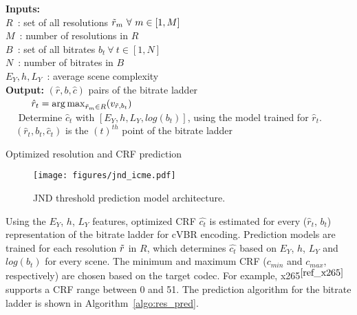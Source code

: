 \documentclass{article}
\DeclareMathOperator*{\argmax}{arg\,max}
\begin{document}
\begin{algorithm}[t]
\textbf{Inputs:}\\
\quad $R$~: set of all resolutions $\Tilde{r}_m~\forall~m \in [1, M]$ \\
\quad $M$~: number of resolutions in $R$\\
\quad $B$~: set of all bitrates $b_t~\forall~t \in [1, N]$ \\
\quad $N$~: number of bitrates in $B$\\
\quad $E_Y, h, L_Y$~: average scene complexity \\
\textbf{Output:} $(\hat{r},b,\hat{c})$ pairs of the bitrate ladder \\

{
$\quad$ 
$\quad$ $\hat{r}_{t} = \argmax_{\Tilde{r}_{m}\in R}(v_{\Tilde{r}, b_{t}})$\\
$\quad$ Determine $\hat{c}_{t}$ with $[E_Y, h, L_Y, log(b_t)]$, using the model trained for $\hat{r}_{t}$.\\
$\quad (\hat{r}_{t}, b_{t}, \hat{c}_{t})$ is the $(t)^{th}$ point of the bitrate ladder\\
}
\caption{Optimized resolution and CRF prediction}
\label{algo:res_pred}
\end{algorithm}
\setlength{\textfloatsep}{3pt}
\begin{figure*}[t]
\centering
\texttt{[image: figures/jnd\_icme.pdf]}
\vspace{-0.2cm}
\caption{JND threshold prediction model architecture.}
\label{fig:jnd_model}
\vspace{-0.95em}
\end{figure*}

Using the $E_Y$, $h$, $L_Y$ features, optimized CRF $\hat{c_{t}}$ is estimated for every ($\hat{r}_{t}$, $b_{t}$) representation of the bitrate ladder for cVBR encoding. Prediction models are trained for each resolution $\Tilde{r}$ in $R$, which determines $\hat{c_{t}}$ based on $E_Y$, $h$, $L_Y$ and $log(b_{t})$ for every scene. The minimum and maximum CRF ($c_{min}$ and $c_{max}$, respectively) are chosen based on the target codec. For example, x265$^{\ref{ref_x265}}$ supports a CRF range between 0 and 51. The prediction algorithm for the bitrate ladder is shown in Algorithm~\ref{algo:res_pred}.
\vspace{-0.70em}
\end{document}
